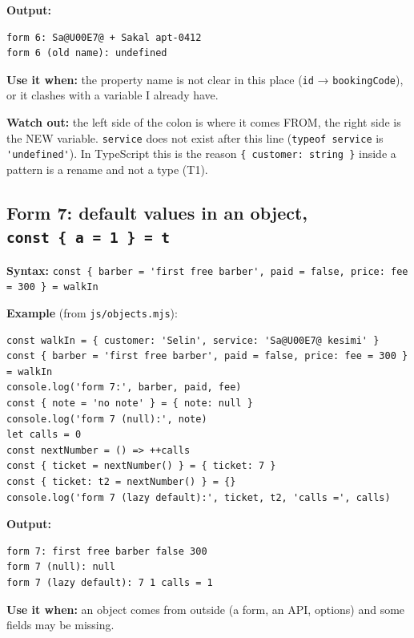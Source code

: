 \textbf{Output:}

\begin{lstlisting}
form 6: Sa@U00E7@ + Sakal apt-0412
form 6 (old name): undefined
\end{lstlisting}

\textbf{Use it when:} the property name is not clear in this place (\passthrough{\lstinline!id!} → \passthrough{\lstinline!bookingCode!}), or it clashes
with a variable I already have.

\textbf{Watch out:} the left side of the colon is where it comes FROM, the right side is the NEW variable.
\passthrough{\lstinline!service!} does not exist after this line (\passthrough{\lstinline!typeof service!} is \passthrough{\lstinline!'undefined'!}). In TypeScript this is the
reason \passthrough{\lstinline!\{ customer: string \}!} inside a pattern is a rename and not a type (T1).

\subsection{\texorpdfstring{Form 7: default values in an object, \texttt{const\ \{\ a\ =\ 1\ \}\ =\ t}}{Form 7: default values in an object, const \{ a = 1 \} = t}}\label{form-7-default-values-in-an-object-const-a-1-t}

\textbf{Syntax:} \passthrough{\lstinline!const \{ barber = 'first free barber', paid = false, price: fee = 300 \} = walkIn!}

\textbf{Example} (from \passthrough{\lstinline!js/objects.mjs!}):

\begin{lstlisting}
const walkIn = { customer: 'Selin', service: 'Sa@U00E7@ kesimi' }
const { barber = 'first free barber', paid = false, price: fee = 300 } = walkIn
console.log('form 7:', barber, paid, fee)
const { note = 'no note' } = { note: null }
console.log('form 7 (null):', note)
let calls = 0
const nextNumber = () => ++calls
const { ticket = nextNumber() } = { ticket: 7 }
const { ticket: t2 = nextNumber() } = {}
console.log('form 7 (lazy default):', ticket, t2, 'calls =', calls)
\end{lstlisting}

\textbf{Output:}

\begin{lstlisting}
form 7: first free barber false 300
form 7 (null): null
form 7 (lazy default): 7 1 calls = 1
\end{lstlisting}

\textbf{Use it when:} an object comes from outside (a form, an API, options) and some fields may be missing.

